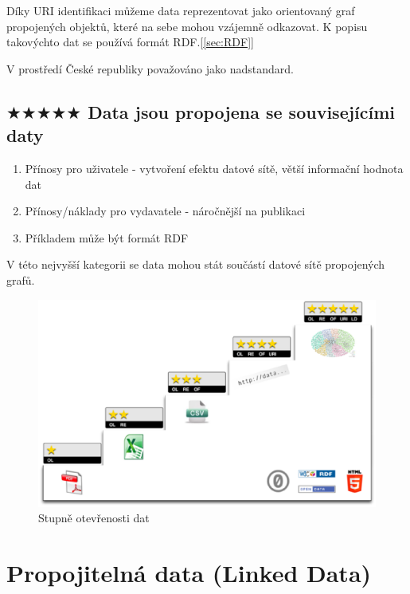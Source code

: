 Díky URI identifikaci můžeme data reprezentovat jako orientovaný graf propojených objektů, které na sebe mohou vzájemně odkazovat. K popisu takovýchto dat se používá formát RDF.[\ref{sec:RDF}]  

V prostředí České republiky považováno jako nadstandard.

\subsection*{$\bigstar\bigstar\bigstar\bigstar\bigstar$ Data jsou propojena se souvisejícími daty}

\medskip

\begin{enumerate}
\item Přínosy pro uživatele - vytvoření efektu datové sítě, větší informační hodnota dat    
\item Přínosy/náklady pro vydavatele - náročnější na publikaci
\item Příkladem může být formát RDF
\end{enumerate}

V této nejvyšší kategorii se data mohou stát součástí datové sítě propojených grafů.

\begin{figure}[h]
\centerline{\includegraphics[width=\textwidth]{img/5star_steps.eps}}
\caption{Stupně otevřenosti dat}
\label{obr:5star_steps}
\end{figure}

\newpage

\section{Propojitelná data (Linked Data)}

